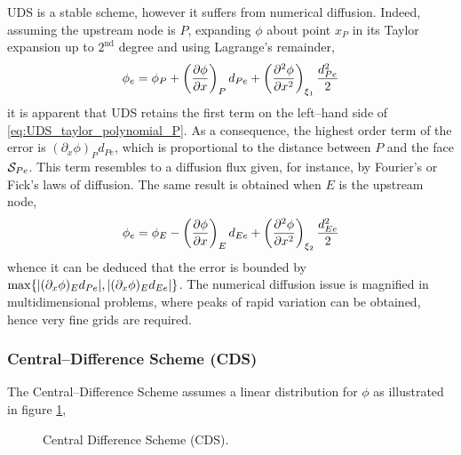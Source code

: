 UDS is a stable scheme, however it suffers from numerical diffusion. Indeed, assuming the upstream node is $P$, expanding $\phi$ about point $x_P$ in its Taylor expansion up to $2^\text{nd}$ degree and using Lagrange's remainder,
\begin{equation} \label{eq:UDS_taylor_polynomial_P}
	\phi_e = 
	\phi_P + \left(\pdv{\phi}{x}\right)_P d_{Pe} + 
	\left(\pdv[2]{\phi}{x}\right)_{\xi_1} \frac{d_{Pe}^2}{2}
\end{equation}
it is apparent that UDS retains the first term on the left--hand side of \eqref{eq:UDS_taylor_polynomial_P}. As a consequence, the highest order term of the error is $(\partial_x \phi)_P d_{Pe}$, which is proportional to the distance between $P$ and the face $\mathcal{S}_{Pe}$. This term resembles to a diffusion flux given, for instance, by Fourier's or Fick's laws of diffusion. The same result is obtained when $E$ is the upstream node,
\begin{equation}
	\phi_e = 
	\phi_E - \left(\pdv{\phi}{x}\right)_E d_{Ee} + \left(\pdv[2]{\phi}{x}\right)_{\xi_2} \frac{d_{Ee}^2}{2}
\end{equation}
whence it can be deduced that the error is bounded by $\max\{ \abs{(\partial_x \phi)_E d_{Pe}}, \abs{(\partial_x \phi)_E d_{Ee}}\}$. The numerical diffusion issue is magnified in multidimensional problems, where peaks of rapid variation can be obtained, hence very fine grids are required. 

\subsubsection{Central--Difference Scheme (CDS)}

The Central--Difference Scheme assumes a linear distribution for $\phi$ as illustrated in figure \ref{fig:central_difference_scheme},
\begin{figure}[h]
	\centering
	\caption{Central Difference Scheme (CDS).}
	\label{fig:central_difference_scheme}
\end{figure}

